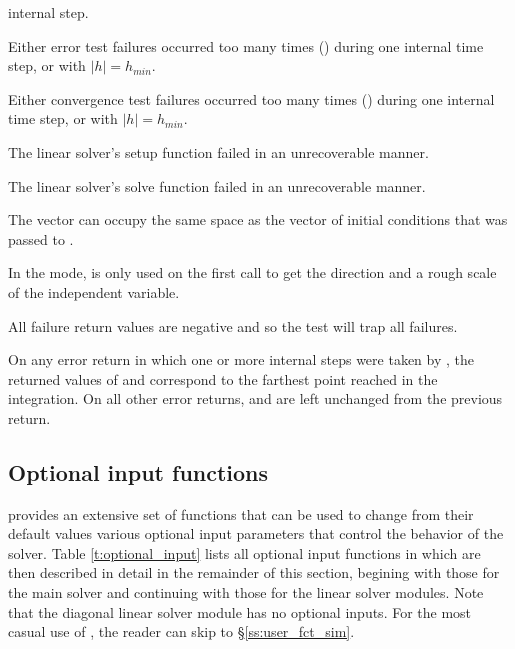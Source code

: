 {\begin{args}
    internal step.
  \item[\Id{CV\_ERR\_FAILURE}]
    Either error test failures occurred too many times () during one 
    internal time step, or with $|h| = h_{min}$.
  \item[\Id{CV\_CONV\_FAILURE}] 
    Either convergence test failures occurred too many times () during 
    one internal time step, or with $|h| = h_{min}$.             
  \item[\Id{CV\_LSETUP\_FAIL}] 
    The linear solver's setup function failed in an unrecoverable manner.
  \item[\Id{CV\_LSOLVE\_FAIL}] 
    The linear solver's solve function failed in an unrecoverable manner.
  \end{args} 
}
{
  The vector  can occupy the same space as the  vector of 
  initial conditions that was passed to . 

  In the  mode,  is only used on the first call
  to get the direction and a rough scale of the independent variable.

  All failure return values are negative and so the test 
  will trap all  failures.

  On any error return in which one or more internal steps were taken by
  , the returned values of  and  correspond to
  the farthest point reached in the integration.  On all other error returns,
   and  are left unchanged from the previous 
  return.

}

\subsection{Optional input functions}\label{ss:optional_input}

{\cvodes} provides an extensive set of functions that can be used to change
from their default values various optional input parameters that control the
behavior of the {\cvodes} solver. 
Table \ref{t:optional_input} lists all optional input functions in {\cvodes} which 
are then described in detail in the remainder of this section, begining with those
for the main {\cvode} solver and continuing with those for the linear solver
modules. Note that the diagonal linear solver module has no optional inputs.
For the most casual use of {\cvodes}, the reader can skip to \S\ref{ss:user_fct_sim}.

